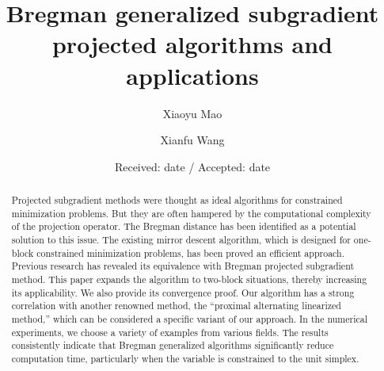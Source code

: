 \documentclass{svjour3}                %
\begin{document}
\graphicspath{{./FIG/}}

\title{Bregman generalized subgradient projected algorithms and applications}

\author{Xiaoyu Mao \and Xianfu Wang}




\date{Received: date / Accepted: date}

\maketitle

\begin{abstract}
Projected subgradient methods were thought as ideal algorithms for constrained minimization problems. But they are often hampered by the computational complexity of the projection operator. The Bregman distance has been identified as a potential solution to this issue. The existing mirror descent algorithm, which is designed for one-block constrained minimization problems, has been proved an efficient approach. Previous research has revealed its equivalence with Bregman projected subgradient method. This paper expands the algorithm to two-block situations, thereby increasing its applicability. We also provide its convergence proof. Our algorithm has a strong correlation with another renowned method, the “proximal alternating linearized method,” which can be considered a specific variant of our approach. In the numerical experiments, we choose a variety of examples from various fields. The results consistently indicate that Bregman generalized algorithms significantly reduce computation time, particularly when the variable is constrained to the unit simplex.

\end{abstract}

\end{document}
